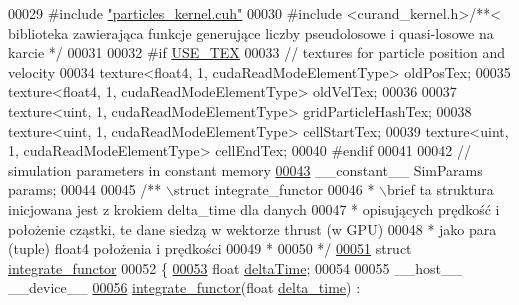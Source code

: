 \begin{DoxyCode}
00029 \textcolor{preprocessor}{#}\textcolor{preprocessor}{include} \hyperlink{particles__kernel_8cuh}{"particles\_kernel.cuh"}
00030 \textcolor{preprocessor}{#}\textcolor{preprocessor}{include} \textcolor{preprocessor}{<}\textcolor{preprocessor}{curand\_kernel}\textcolor{preprocessor}{.}\textcolor{preprocessor}{h}\textcolor{preprocessor}{>}\textcolor{comment}{/**< biblioteka zawierająca funkcje generujące liczby pseudolosowe i
       quasi-losowe na karcie */}
00031 
00032 \textcolor{preprocessor}{#}\textcolor{preprocessor}{if} \hyperlink{particles__kernel_8cuh_a0ab211ca35e2616c721fcf2dd4f99c83}{USE\_TEX}
00033 \textcolor{comment}{// textures for particle position and velocity}
00034 texture<float4, 1, cudaReadModeElementType> oldPosTex;
00035 texture<float4, 1, cudaReadModeElementType> oldVelTex;
00036 
00037 texture<uint, 1, cudaReadModeElementType> gridParticleHashTex;
00038 texture<uint, 1, cudaReadModeElementType> cellStartTex;
00039 texture<uint, 1, cudaReadModeElementType> cellEndTex;
00040 \textcolor{preprocessor}{#}\textcolor{preprocessor}{endif}
00041 
00042 \textcolor{comment}{// simulation parameters in constant memory}
\hypertarget{particles__kernel__impl_8cuh_source_l00043}{}\hyperlink{particles__kernel__impl_8cuh_a8db8938e28edd17862daf58651051bdc}{00043} \_\_constant\_\_ SimParams params;
00044 
00045 \textcolor{comment}{/** \(\backslash\)struct integrate\_functor}
00046 \textcolor{comment}{ * \(\backslash\)brief ta struktura inicjowana jest z krokiem delta\_time dla danych}
00047 \textcolor{comment}{ * opisujących prędkość i położenie cząstki, te dane siedzą w wektorze thrust (w GPU)}
00048 \textcolor{comment}{ * jako para (tuple) float4 położenia i prędkości}
00049 \textcolor{comment}{ *}
00050 \textcolor{comment}{ */}
\hypertarget{particles__kernel__impl_8cuh_source_l00051}{}\hyperlink{structintegrate__functor}{00051} \textcolor{keyword}{struct} \hyperlink{structintegrate__functor_a772e86ead8690332beb50911e4448f81}{integrate\_functor}
00052 \{
\hypertarget{particles__kernel__impl_8cuh_source_l00053}{}\hyperlink{structintegrate__functor_a06dce1826719cd5b2a9fdd9f566da754}{00053}     \textcolor{keywordtype}{float} \hyperlink{structintegrate__functor_a06dce1826719cd5b2a9fdd9f566da754}{deltaTime};
00054 
00055     \_\_host\_\_ \_\_device\_\_
\hypertarget{particles__kernel__impl_8cuh_source_l00056}{}\hyperlink{structintegrate__functor_a13075d4c547ba22c37137ff2b874ae45}{00056}     \hyperlink{structintegrate__functor_a772e86ead8690332beb50911e4448f81}{integrate\_functor}(\textcolor{keywordtype}{float} \hyperlink{structintegrate__functor_a772e86ead8690332beb50911e4448f81}{delta\_time}) : 

\end{DoxyCode}
